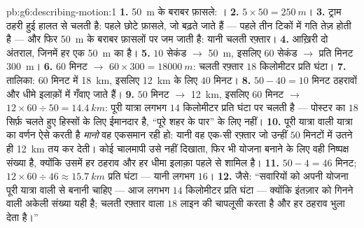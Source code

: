 \begin{solution}{pb:g6:describing-motion:1}
\textbf{1.} \qty{50}{m} के बराबर फ़ासले: ।
\textbf{2.} $5 \times 50 = \qty{250}{m}$।
\textbf{3.} ट्राम ठहरी हुई हालत से चलती है: पहले छोटे फ़ासले, जो
बढ़ते जाते हैं --- पहले तीन टिकों में गति तेज़ होती है --- और फिर
\qty{50}{m} के बराबर फ़ासलों पर जम जाती है: यानी चलती रफ़्तार।
\textbf{4.} आख़िरी दो अंतराल, जिनमें हर एक \qty{50}{m} का है।
\textbf{5.} $10$ सेकंड $\to$ \qty{50}{m}, इसलिए $60$ सेकंड $\to$
प्रति मिनट \qty{300}{m}।
\textbf{6.} $60$ मिनट $\to$ $60 \times 300 = \qty{18000}{m}$:
चलती रफ़्तार $18$ किलोमीटर प्रति घंटा।
\textbf{7.} तालिका: $60$ मिनट में \qty{18}{km}, इसलिए \qty{12}{km}
के लिए $40$ मिनट।
\textbf{8.} $50 - 40 = 10$ मिनट ठहरावों और धीमे इलाक़ों में गँवाए
जाते हैं।
\textbf{9.} $50$ मिनट $\to$ \qty{12}{km}, इसलिए $60$ मिनट $\to$
$12 \times 60 \div 50 = \qty{14.4}{km}$: पूरी यात्रा लगभग $14$
किलोमीटर प्रति घंटा पर चलती है --- पोस्टर का $18$ सिर्फ़ चलते हुए
हिस्सों के लिए ईमानदार है, ``पूरे शहर के पार'' के लिए नहीं।
\textbf{10.} पूरी यात्रा वाली  यात्रा का वर्णन ऐसे करती है
\emph{मानो} वह एकसमान रही हो: यानी वह एक-सी रफ़्तार जो उन्हीं $50$
मिनटों में उतने ही \qty{12}{km} तय कर देती। कोई चालमापी उसे नहीं
दिखाता, फिर भी योजना बनाने के लिए वही निष्पक्ष संख्या है, क्योंकि
उसमें हर ठहराव और हर धीमा इलाक़ा पहले से शामिल है।
\textbf{11.} $50 - 4 = 46$ मिनट; $12 \times 60 \div 46 \approx
\qty{15.7}{km}$ प्रति घंटा --- यानी लगभग $16$।
\textbf{12.} जैसे: ``सवारियों को अपनी योजना पूरी यात्रा वाली  से
बनानी चाहिए --- आज लगभग $14$ किलोमीटर प्रति घंटा --- क्योंकि इंतज़ार
को गिनने वाली अकेली संख्या यही है; चलती रफ़्तार वाला $18$ लाइन की
चापलूसी करता है और हर ठहराव भुला देता है।''
\end{solution}

